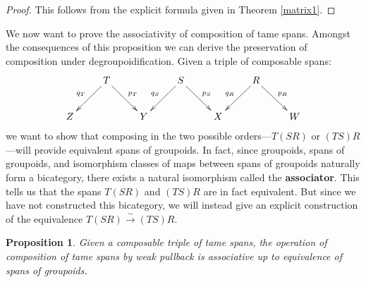 \documentclass{article}
\newtheorem{proposition}[thm]{Proposition}
\begin{document}
\begin{proof}
This follows from the explicit formula given in Theorem \ref{matrix1}.
\end{proof}

We now want to prove the associativity of composition of tame spans.
Amongst the consequences of this proposition we can derive the
preservation of composition under degroupoidification.  Given a triple
of composable spans:
\[
\xymatrix{
 & T \ar[dl]_{q_T}\ar[dr]^{p_T} && S \ar[dl]_{q_S}\ar[dr]^{p_S} && R \ar[dl]_{q_R}\ar[dr]^{p_R} &\\
Z && Y && X && W
}
\]
we want to show that composing in the two possible orders---$T(SR)$
or $(TS)R$---will provide equivalent spans of groupoids.  In fact,
since groupoids, spans of groupoids, and isomorphism classes of maps
between spans of groupoids naturally form a bicategory, there exists a
natural isomorphism called the {\bf associator}.  This tells us that
the spans $T(SR)$ and $(TS)R$ are in fact equivalent.  But since we
have not constructed this bicategory, we will instead give an explicit
construction of the equivalence $T(SR) \stackrel{\sim}\rightarrow
(TS)R$.  

\begin{proposition}\label{associativity}
Given a composable triple of tame spans, the operation of composition
of tame spans by weak pullback is associative up to equivalence of
spans of groupoids.
\end{proposition}
\end{document}
